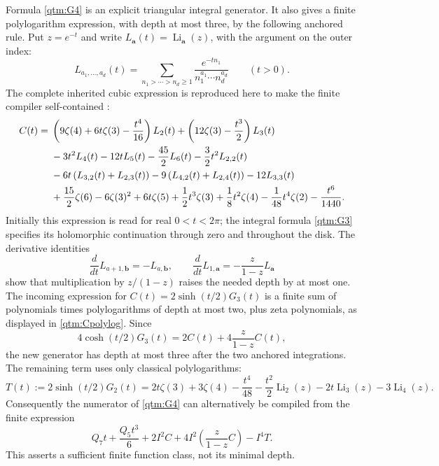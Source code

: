 \documentclass[11pt,a4paper]{article}
\numberwithin{equation}{section}
\theoremstyle{plain}
\theoremstyle{definition}
\theoremstyle{remark}
\begin{document}
Formula \eqref{qtm:G4} is an explicit triangular integral generator.
It also gives a finite polylogarithm expression, with depth at most three,
by the following anchored rule.  Put $z=e^{-t}$ and write
$L_{\boldsymbol a}(t)=\operatorname{Li}_{\boldsymbol a}(z)$, with
the argument on the outer index:
\[
 L_{a_1,\ldots,a_d}(t)
   =\sum_{n_1>\cdots>n_d\ge1}
        \frac{e^{-tn_1}}{n_1^{a_1}\cdots n_d^{a_d}}\qquad(t>0).
\]
The complete inherited cubic expression is reproduced here to make
the finite compiler self-contained
\cite[Section 6, finite depth-two generator]{Reconstruction}:
\begin{align}
 C(t)={}&
 \left(9\zeta(4)+6t\zeta(3)-\frac{t^4}{16}\right)L_2(t)
 +\left(12\zeta(3)-\frac{t^3}{2}\right)L_3(t)
       \notag\\
 &-3t^2L_4(t)-12tL_5(t)-\frac{45}{2}L_6(t)
       -\frac32t^2L_{2,2}(t)
       \notag\\
 &-6t\left(L_{3,2}(t)+L_{2,3}(t)\right)
       -9\left(L_{4,2}(t)+L_{2,4}(t)\right)-12L_{3,3}(t)
       \notag\\
 &+\frac{15}{2}\zeta(6)-6\zeta(3)^2+6t\zeta(5)
       +\frac12t^3\zeta(3)+\frac18t^2\zeta(4)
       -\frac1{48}t^4\zeta(2)-\frac{t^6}{1440}.
 \label{qtm:Cpolylog}
\end{align}
Initially this expression is read for real $0<t<2\pi$; the integral
formula \eqref{qtm:G3} specifies its holomorphic continuation through
zero and throughout the disk.  The derivative identities
\[
 \frac d{dt}L_{a+1,\boldsymbol b}=-L_{a,\boldsymbol b},\qquad
 \frac d{dt}L_{1,\boldsymbol a}
       =-\frac{z}{1-z}L_{\boldsymbol a}
\]
show that multiplication by $z/(1-z)$ raises the needed depth by at
most one.  The incoming expression for
$C(t)=2\sinh(t/2)G_3(t)$ is a finite sum of polynomials times
polylogarithms of depth at most two, plus zeta polynomials, as displayed
in \eqref{qtm:Cpolylog}.  Since
\[
 4\cosh(t/2)G_3(t)=2C(t)+4\frac{z}{1-z}C(t),
\]
the new generator has depth at most three after the two anchored
integrations.  The remaining term uses only classical polylogarithms:
\begin{equation}\label{qtm:Tpolylog}
 T(t):=2\sinh(t/2)G_2(t)
 =2t\zeta(3)+3\zeta(4)-\frac{t^4}{48}
   -\frac{t^2}{2}\operatorname{Li}_2(z)
   -2t\operatorname{Li}_3(z)-3\operatorname{Li}_4(z).
\end{equation}
Consequently the numerator of \eqref{qtm:G4} can alternatively be
compiled from the finite expression
\begin{equation}\label{qtm:finitecompiler}
 Q_7t+\frac{Q_5t^3}{6}+2I^2C
       +4I^2\left(\frac{z}{1-z}C\right)-I^4T.
\end{equation}
This asserts a sufficient finite function class, not its minimal depth.
\end{document}
